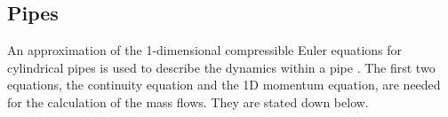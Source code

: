 



\subsection{Pipes}\label{sec::pipes}
An approximation of the 1-dimensional compressible Euler equations for cylindrical pipes is used to describe the dynamics within a pipe \cite{Krug2020}. The first two equations, the continuity equation and the 1D momentum equation, are needed for the calculation of the mass flows. They are stated down below.

